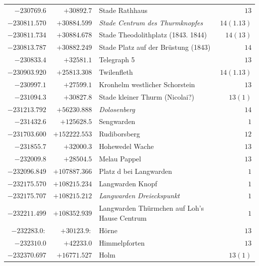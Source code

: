 \begin{center}
\begin{tabular}{r|r|p{170pt}|r}
\(-230769.6\)&\(+30892.7\)&Stade Rathhaus&\(13\)\\
\(-230811.570\)&\(+30884.599\)&\textit{Stade Centrum des Thurmknopfes}&\(14(1.13)\)\\
\(-230811.734\)&\(+30884.678\)&Stade Theodolithplatz (1843. 1844)&\(14(13)\)\\
\(-230813.787\)&\(+30882.249\)&Stade Platz auf der Brüstung (1843)&\(14\)\\
\(-230833.4\)&\(+32581.1\)&Telegraph 5&\(13\)\\
\(-230903.920\)&\(+25813.308\)&Twilenfleth&\(14(1.13)\)\\
\(-230997.1\)&\(+27599.1\)&Kronhelm westlicher Schorstein&\(13\)\\
\(-231094.3\)&\(+30827.8\)&Stade kleiner Thurm (Nicolai?)&\(13(1)\)\\
\(-231213.792\)&\(+56230.888\)&\textit{Dolosenberg}&\(14\)\\
\(-231432.6\)&\(+125628.5\)&Sengwarden&\(1\)\\
\(-231703.600\)&\(+152222.553\)&Rudiborsberg&\(12\)\\
\(-231855.7\)&\(+32000.3\)&Hohewedel Wache&\(13\)\\
\(-232009.8\)&\(+28504.5\)&Melau Pappel&\(13\)\\
\(-232096.849\)&\(+107887.366\)&Platz d bei Langwarden&\(1\)\\
\(-232175.570\)&\(+108215.234\)&Langwarden Knopf&\(1\)\\
\(-232175.707\)&\(+108215.212\)&\textit{Langwarden Dreieckspunkt}&\(1\)\\
\(-232211.499\)&\(+108352.939\)&Langwarden Thürmchen auf Loh’s Hause Centrum&\(1\)\\
\(-232283.0:\)&\(+30123.9:\)&Hörne&\(13\)\\
\(-232310.0\)&\(+42233.0\)&Himmelpforten&\(13\)\\
\(-232370.697\)&\(+16771.527\)&Holm&\(13(1)\)\\
\hline\end{tabular}\endgroup\end{center}
